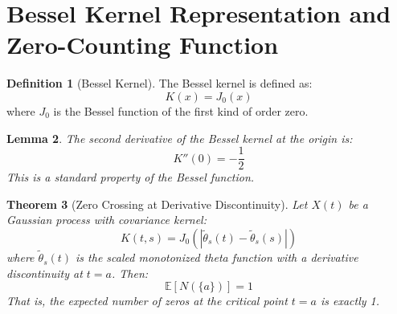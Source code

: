 \documentclass{article}
\newtheorem{theorem}{Theorem}
\newtheorem{lemma}[theorem]{Lemma}
\theoremstyle{definition}
\newtheorem{definition}[theorem]{Definition}
\begin{document}
\section{Bessel Kernel Representation and Zero-Counting Function}

\begin{definition}[Bessel Kernel]
The Bessel kernel is defined as:
\begin{equation}
K(x) = J_0(x)
\end{equation}
where $J_0$ is the Bessel function of the first kind of order zero.
\end{definition}

\begin{lemma}
The second derivative of the Bessel kernel at the origin is:
\begin{equation}
K''(0) = -\frac{1}{2}
\end{equation}
This is a standard property of the Bessel function.
\end{lemma}

\begin{theorem}[Zero Crossing at Derivative Discontinuity]\label{thm:zero-crossing}
Let $X(t)$ be a Gaussian process with covariance kernel:
\begin{equation}
K(t,s) = J_0\left(|\tilde{\theta}_s(t) - \tilde{\theta}_s(s)|\right)
\end{equation}
where $\tilde{\theta}_s(t)$ is the scaled monotonized theta function with a derivative discontinuity at $t = a$. Then:
\begin{equation}
\mathbb{E}[N(\{a\})] = 1
\end{equation}
That is, the expected number of zeros at the critical point $t = a$ is exactly 1.
\end{theorem}
\end{document}
